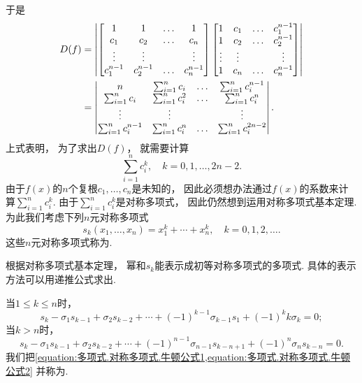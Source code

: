 于是\begin{align}
	D(f)
	&= \abs{
		\begin{bmatrix}
			1 & 1 & \dots & 1 \\
			c_1 & c_2 & \dots & c_n \\
			\vdots & \vdots && \vdots \\
			c_1^{n-1} & c_2^{n-1} & \dots & c_n^{n-1}
		\end{bmatrix}
		\begin{bmatrix}
			1 & c_1 & \dots & c_1^{n-1} \\
			1 & c_2 & \dots & c_2^{n-1} \\
			\vdots & \vdots && \vdots \\
			1 & c_n & \dots & c_n^{n-1}
		\end{bmatrix}
	} \notag \\
	&= \begin{vmatrix}
		n & \sum_{i=1}^n c_i & \dots & \sum_{i=1}^n c_i^{n-1} \\
		\sum_{i=1}^n c_i & \sum_{i=1}^n c_i^2 & \dots & \sum_{i=1}^n c_i^n \\
		\vdots & \vdots && \vdots \\
		\sum_{i=1}^n c_i^{n-1} & \sum_{i=1}^n c_i^n & \dots & \sum_{i=1}^n c_i^{2n-2}
	\end{vmatrix}.
	\label{equation:多项式.对称多项式.范德蒙德}
\end{align}
上式表明，
为了求出\(D(f)\)，
就需要计算\begin{equation*}
	\sum_{i=1}^n c_i^k,
	\quad k=0,1,\dotsc,2n-2.
\end{equation*}
由于\(f(x)\)的\(n\)个复根\(c_1,\dotsc,c_n\)是未知的，
因此必须想办法通过\(f(x)\)的系数来计算\(\sum_{i=1}^n c_i^k\).
由于\(\sum_{i=1}^n c_i^k\)是对称多项式，
因此仍然想到运用对称多项式基本定理.
为此我们考虑下列\(n\)元对称多项式\begin{equation*}
	s_k(x_1,\dotsc,x_n)
	=x_1^k+\dotsb+x_n^k,
	\quad k=0,1,2,\dotsc.
\end{equation*}
这些\(n\)元对称多项式称为.

根据对称多项式基本定理，
幂和\(s_k\)能表示成初等对称多项式的多项式.
具体的表示方法可以用递推公式求出.

当\(1\leq k\leq n\)时，
\begin{equation}\label{equation:多项式.对称多项式.牛顿公式1}
	s_k
	- \sigma_1 s_{k-1}
	+ \sigma_2 s_{k-2}
	+ \dotsb
	+ (-1)^{k-1} \sigma_{k-1} s_1
	+ (-1)^k k \sigma_k
	=0;
\end{equation}
当\(k>n\)时，
\begin{equation}\label{equation:多项式.对称多项式.牛顿公式2}
	s_k
	- \sigma_1 s_{k-1}
	+ \sigma_2 s_{k-2}
	+ \dotsb
	+ (-1)^{n-1} \sigma_{n-1} s_{k-n+1}
	+ (-1)^n \sigma_n s_{k-n}
	=0.
\end{equation}
我们把\cref{equation:多项式.对称多项式.牛顿公式1,equation:多项式.对称多项式.牛顿公式2}
并称为.

